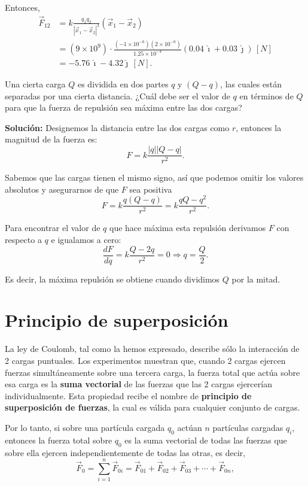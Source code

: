\begin{ejemplo}
Entonces,
\begin{align*}
    \vec{F}_{12} &= k \frac{q_1q_2}{|\vec{x}_1 - \vec{x}_2|^3} (\vec{x}_1 - \vec{x}_2) \\
&= (9 \times 10^9) \cdot \frac{(-1\times 10^{-6})(2\times 10^{-6})}{1.25 \times 10^{-4}} (0.04 \,\hat{\imath} + 0.03 \,\hat{\jmath})  \, [N]\\
&= -5.76 \,\hat{\imath} - 4.32 \hat{\jmath} \,[N].
\end{align*}

\end{ejemplo}


\begin{ejemplo}
    Una cierta carga $Q$ es dividida en dos partes $q$ y $(Q-q)$, las cuales están separadas por una cierta distancia. ¿Cuál debe ser el valor de $q$ en términos de $Q$ para que la fuerza de repulsión sea máxima entre las dos cargas?

\textbf{Solución:} Designemos la distancia entre las dos cargas como $r$, entonces la magnitud de la fuerza es:
$$F = k \frac{|q||Q-q|}{r^2}.$$

Sabemos que las cargas tienen el mismo signo, así que podemos omitir los valores absolutos y asegurarnos de que $F$ sea positiva
$$F = k \frac{q(Q-q)}{r^2} = k \frac{qQ-q^2}{r^2}.$$

Para encontrar el valor de $q$ que hace máxima esta repulsión derivamos $F$ con respecto a $q$ e igualamos a cero:
$$\frac{dF}{dq} = k \frac{Q -2q}{r^2} = 0 \Rightarrow q = \frac{Q}{2}.$$

Es decir, la máxima repulsión se obtiene cuando dividimos $Q$ por la mitad.
\end{ejemplo}


 \section{Principio de superposición}

La ley de Coulomb, tal como la hemos expresado, describe sólo la interacción de 2 cargas puntuales. Los experimentos muestran que, cuando 2 cargas ejercen fuerzas simultáneamente sobre una tercera carga, la fuerza total que actúa sobre esa carga es la \textbf{suma vectorial} de las fuerzas que las 2 cargas ejercerían individualmente. Esta propiedad recibe el nombre de \textbf{principio de superposición de fuerzas}, la cual es válida para cualquier conjunto de cargas.

Por lo tanto, si sobre una partícula cargada $q_0$ actúan $n$ partículas cargadas $q_i$, entonces la fuerza total sobre $q_0$ es la suma vectorial de todas las fuerzas que sobre ella ejercen independientemente de todas las otras, es decir,
$$\vec{F}_0 = \sum_{i=1}^n \vec{F}_{0i} = \vec{F}_{01} + \vec{F}_{02} + \vec{F}_{03} + \cdots + \vec{F}_{0n},$$



